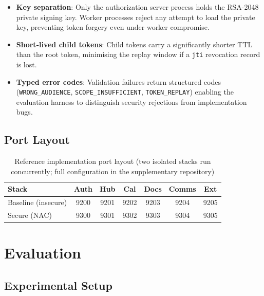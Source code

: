 \documentclass[journal]{IEEEtran}
\begin{document}
\begin{itemize}
  \item \textbf{Key separation}: Only the authorization server process holds the
        RSA-2048 private signing key. Worker processes reject any attempt to load
        the private key, preventing token forgery even under worker compromise.
  \item \textbf{Short-lived child tokens}: Child tokens carry a significantly
        shorter TTL than the root token, minimising the replay window if a
        \texttt{jti} revocation record is lost.
  \item \textbf{Typed error codes}: Validation failures return structured codes
        (\texttt{WRONG\_AUDIENCE}, \texttt{SCOPE\_INSUFFICIENT},
        \texttt{TOKEN\_REPLAY}) enabling the evaluation harness to distinguish
        security rejections from implementation bugs.
\end{itemize}

\subsection{Port Layout}

\begin{table}[h]
\caption{Reference implementation port layout (two isolated stacks
run concurrently; full configuration in the supplementary repository)}
\label{tab:ports}
\centering
\footnotesize
\begin{tabular}{lcccccc}
\toprule
\textbf{Stack} & \textbf{Auth} & \textbf{Hub} & \textbf{Cal}
               & \textbf{Docs} & \textbf{Comms} & \textbf{Ext} \\
\midrule
Baseline (insecure) & 9200 & 9201 & 9202 & 9203 & 9204 & 9205 \\
Secure (NAC)        & 9300 & 9301 & 9302 & 9303 & 9304 & 9305 \\
\bottomrule
\end{tabular}
\end{table}


\section{Evaluation}
\label{sec:eval}

\subsection{Experimental Setup}
\end{document}

